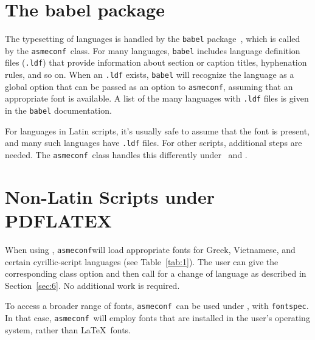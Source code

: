 \documentclass[colorlinks,nofoot,fontspec,spanish,japanese,russian,greek,ukrainian,vietnamese,french,portuguese,turkish,polish,indonesian,italian,german,latin,serbianc,bidi=basic]{asmeconf}
\newcommand*\FS{{\upshape\texttt{fontspec}}}
\newcommand*\LLT{{\upshape\LuaLaTeX}}
\newcommand*\AC{{\upshape\texttt{asmeconf}}}
\newcommand*\PLT{{\upshape\texttt{\hologo{pdfLaTeX}}}}
\begin{document}
\section{The babel package}
The typesetting of languages is handled by the \texttt{babel} package~\cite{bezos2020}, which is called by the \AC\ class. For many languages, \texttt{babel} includes language definition files (\texttt{.ldf}) that provide information about section or caption titles, hyphenation rules, and so on.  When an \texttt{.ldf} exists, \texttt{babel} will recognize the language as a global option that can be passed as an option to \AC, assuming that an appropriate font is available. A list of the many languages with \texttt{.ldf} files is given in the \texttt{babel} documentation.

For languages in Latin scripts, it's usually safe to assume that the font is present, and many such languages have \texttt{.ldf} files. For other scripts, additional steps are needed. The \AC\ class handles this differently under \PLT\ and \LLT. 

\section{Non-Latin Scripts under PDFLATEX}
When using \PLT, \AC will load appropriate fonts for Greek, Vietnamese, and certain cyrillic-script languages (see Table~\ref{tab:1}). The user can give the corresponding class option and then call for a change of language as described in Section~\ref{sec:6}. No additional work is required.  

To access a broader range of fonts, \AC\ can be used under \LLT, with \FS. In that case, \AC\ will employ fonts that are installed in the user's operating system, rather than \LaTeX\ fonts.
\end{document}
